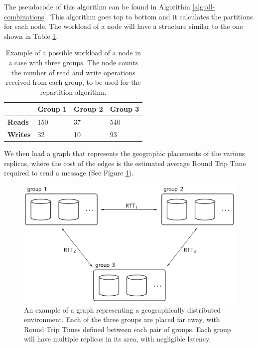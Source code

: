 The pseudocode of this algorithm can be found in Algorithm \ref{alg:all-combinations}. This algorithm goes top to bottom and it calculates the partitions for each node. The workload of a node will have a structure similar to the one shown in Table \ref{tab:workload-example}.

\begin{table}[!htb]
  \centering
  \begin{tabular}{l l l l}
    \hline
    & \textbf{Group 1} & \textbf{Group 2} & \textbf{Group 3} \\
    \hline
    \textbf{Reads} & 150 & 37 & 540 \\
    \textbf{Writes} & 32 & 10 & 93 \\
    \hline
  \end{tabular}
  \caption{Example of a possible workload of a node in a case with three groups. The node counts the number of read and write operations received from each group, to be used for the repartition algorithm.}\label{tab:workload-example}
\end{table}

We then load a graph that represents the geographic placements of the various replicas, where the cost of the edges is the estimated average Round Trip Time required to send a message (See Figure \ref{fig:graph}).

\begin{figure}[!htb]
  \centering
  \includegraphics[width=\textwidth,height=\textheight,keepaspectratio]{img/graph.png}
  \caption{An example of a graph representing a geographically distributed environment. Each of the three groups are placed far away, with Round Trip Times defined between each pair of groups. Each group will have multiple replicas in its area, with negligible latency.}
  \label{fig:graph}
\end{figure}

